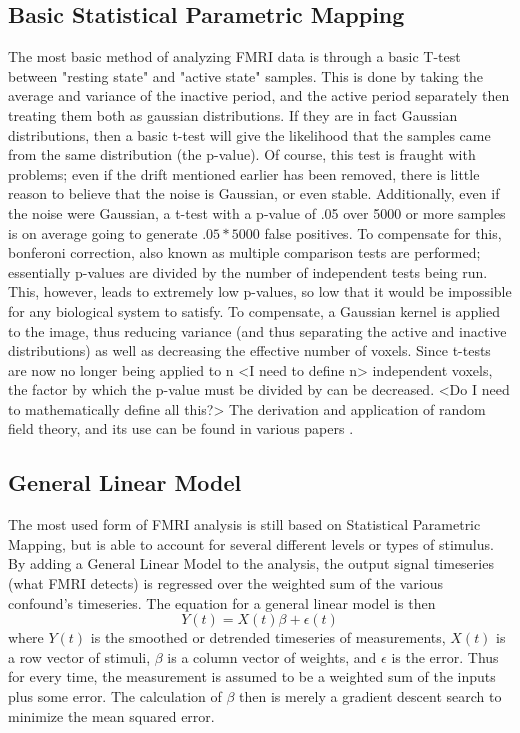 \documentclass{article}
\begin{document}
\subsection{Basic Statistical Parametric Mapping}
The most basic method of analyzing FMRI data is through a basic T-test
between "resting state" and "active state" samples. This is done by 
taking the average and variance of the inactive period, and the 
active period separately then treating them both as gaussian distributions.
If they are in fact Gaussian distributions, then a basic t-test will
give the likelihood that the samples came from the same distribution
(the p-value). Of course, this test is fraught with problems; even if
the drift mentioned earlier has been removed, there is little reason
to believe that the noise is Gaussian, or even stable. Additionally, 
even if the noise were Gaussian, a t-test with a p-value of .05 over
5000 or more samples is on average going to generate $.05*5000$ false
positives. To compensate for this, bonferoni correction, also known as
multiple comparison tests are performed; essentially p-values are 
divided by the number of independent
tests being run. This, however, leads to extremely low p-values, so
low that it would be impossible for any biological system to satisfy. To
compensate, a Gaussian kernel is applied to the image, thus reducing
variance (and thus separating the active and inactive distributions)
as well as decreasing the effective number of voxels. Since t-tests are
now no longer being applied to n <I need to define n> independent voxels,
the factor by which the p-value must be divided by can be decreased.
<Do I need to mathematically define all this?> The derivation and application
of random field theory, and its use can be found in various papers \cite{univ_mult_rft}.

\subsection{General Linear Model}
The most used form of FMRI analysis is still based on Statistical Parametric
Mapping, but is able to account for several different levels or types
of stimulus. By adding a General Linear Model to the analysis, the
output signal timeseries (what FMRI detects) is regressed over the weighted
sum of the various confound's timeseries. The equation for a general linear
model is then
\begin{equation}
Y(t) = X(t)\beta + \epsilon(t)
\end{equation}
where $Y(t)$ is the smoothed or detrended timeseries of measurements,
$X(t)$ is a row vector of stimuli, $\beta$ is a column vector of weights,
and $\epsilon$ is the error. Thus for every time, the measurement is
assumed to be a weighted sum of the inputs plus some error. The calculation
of $\beta$ then is merely a gradient descent search to minimize the
mean squared error. 
\end{document}
